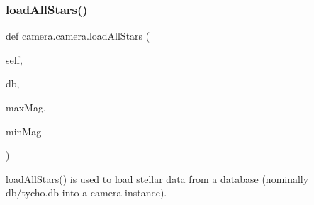 \subsubsection{\texorpdfstring{load\+All\+Stars()}{loadAllStars()}}
{\footnotesize\ttfamily def camera.\+camera.\+load\+All\+Stars (\begin{DoxyParamCaption}\item[{}]{self,  }\item[{}]{db,  }\item[{}]{max\+Mag,  }\item[{}]{min\+Mag }\end{DoxyParamCaption})}



\hyperlink{classcamera_1_1camera_a19a245a417b72f0ae753b5200b1615ff}{load\+All\+Stars()} is used to load stellar data from a database (nominally db/tycho.\+db into a camera instance). 



